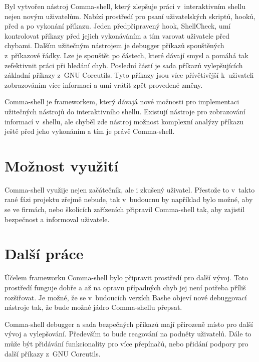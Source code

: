 \documentclass[thesis=M,czech]{FITthesis}[2012/06/26]
\begin{document}
\begin{conclusion}

Byl vytvořen nástroj Comma-shell, který zlepšuje práci v~interaktivním shellu nejen novým uživatelům. Nabízí prostředí pro psaní uživatelských skriptů, hooků, před a po vykonání příkazu. Jeden předpřipravený hook, ShellCheck, umí kontrolovat příkazy před jejich vykonáváním a tím varovat uživatele před chybami. Dalším užitečným nástrojem je debugger příkazů spouštěných z~příkazové řádky. Lze je spouštět po částech, které dávají smysl a pomáhá tak zefektivnit práci při hledání chyb. Poslední částí je sada příkazů vylepšujících základní příkazy z~GNU Coreutils. Tyto příkazy jsou více přívětivější k~uživateli zobrazováním více informací a umí vrátit zpět provedené změny.

Comma-shell je frameworkem, který dávajá nové možnosti pro implementaci užitečných nástrojů do interaktivního shellu. Existují nástroje pro zobrazování informací v~shellu, ale chyběl zde nástroj možnost komplexní analýzy příkazu ještě před jeho vykonáním a tím je právě Comma-shell.


\section{Možnost využití}

Comma-shell využije nejen začátečník, ale i zkušený uživatel. Přestože to v~takto rané fázi projektu zřejmě nebude, tak v~budoucnu by například bylo možné, aby se ve firmách, nebo školících zařízeních připravil Comma-shell tak, aby zajistil bezpečnost a informoval uživatele.


\section{Další práce}

Účelem frameworku Comma-shell bylo připravit prostředí pro další vývoj. Toto prostředí funguje dobře a až na opravu případných chyb jej není potřeba příliš rozšiřovat. Je možné, že se v~budoucích verzích Bashe objeví nové debuggovací nástroje tak, že bude možné jádro Comma-shellu přepsat.

Comma-shell debugger a sada bezpečných příkazů mají přirozeně místo pro další vývoj a vylepšování. Především to bude reagování na podněty uživatelů. Dále to může být přidávání funkcionality pro více přepínačů, nebo přidání podpory pro další příkazy z~GNU Coreutils.


\end{conclusion}
\end{document}
